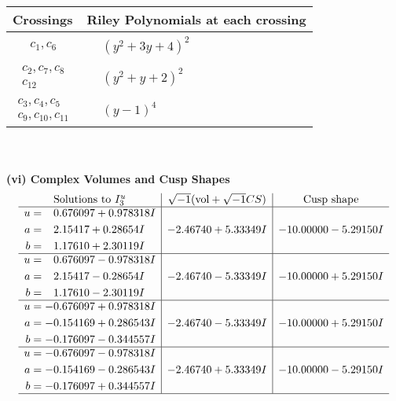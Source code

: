 \documentclass[1p]{elsarticle_modified}
\theoremstyle{definition}
\newcommand{\I}{\sqrt{-1}}
\begin{document}
\begin{tabular}{m{50pt}|m{274pt}}
Crossings & \hspace{64pt}Riley Polynomials at each crossing \\
\hline $$\begin{aligned}c_{1},c_{6}\end{aligned}$$&$\begin{aligned}
&(y^2+3 y+4)^2
\end{aligned}$\\
\hline $$\begin{aligned}c_{2},c_{7},c_{8}\\c_{12}\end{aligned}$$&$\begin{aligned}
&(y^2+y+2)^2
\end{aligned}$\\
\hline $$\begin{aligned}c_{3},c_{4},c_{5}\\c_{9},c_{10},c_{11}\end{aligned}$$&$\begin{aligned}
&(y-1)^4
\end{aligned}$\\
\hline
\end{tabular}\\~\\
\newpage\flushleft \textbf{(vi) Complex Volumes and Cusp Shapes}
$$\begin{array}{c|c|c}  
\text{Solutions to }I^u_{3}& \I (\text{vol} + \sqrt{-1}CS) & \text{Cusp shape}\\
 \hline 
\begin{aligned}
u &= \phantom{-}0.676097 + 0.978318 I \\
a &= \phantom{-}2.15417 + 0.28654 I \\
b &= \phantom{-}1.17610 + 2.30119 I\end{aligned}
 & -2.46740 + 5.33349 I & -10.00000 - 5.29150 I \\ \hline\begin{aligned}
u &= \phantom{-}0.676097 - 0.978318 I \\
a &= \phantom{-}2.15417 - 0.28654 I \\
b &= \phantom{-}1.17610 - 2.30119 I\end{aligned}
 & -2.46740 - 5.33349 I & -10.00000 + 5.29150 I \\ \hline\begin{aligned}
u &= -0.676097 + 0.978318 I \\
a &= -0.154169 + 0.286543 I \\
b &= -0.176097 - 0.344557 I\end{aligned}
 & -2.46740 - 5.33349 I & -10.00000 + 5.29150 I \\ \hline\begin{aligned}
u &= -0.676097 - 0.978318 I \\
a &= -0.154169 - 0.286543 I \\
b &= -0.176097 + 0.344557 I\end{aligned}
 & -2.46740 + 5.33349 I & -10.00000 - 5.29150 I\\
 \hline 
 \end{array}$$\newpage\newpage\renewcommand{\arraystretch}{1}
\end{document}
